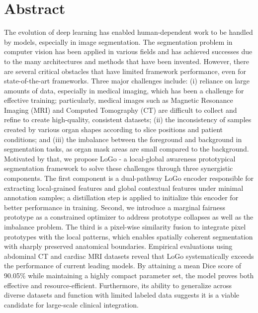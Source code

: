 \chapter*{Abstract}

The evolution of deep learning has enabled human-dependent work to be handled by models, especially in image segmentation. The segmentation problem in computer vision has been applied in various fields and has achieved successes due to the many architectures and methods that have been invented. However, there are several critical obstacles that have limited framework performance, even for state-of-the-art frameworks. Three major challenges include: (i) reliance on large amounts of data, especially in medical imaging, which has been a challenge for effective training; particularly, medical images such as Magnetic Resonance Imaging (MRI) and Computed Tomography (CT) are difficult to collect and refine to create high-quality, consistent datasets; (ii) the inconsistency of samples created by various organ shapes according to slice positions and patient conditions; and (iii) the imbalance between the foreground and background in segmentation tasks, as organ mask areas are small compared to the background. Motivated by that, we propose LoGo - a local-global awareness prototypical segmentation framework to solve these challenges through three synergistic components. The first component is a dual-pathway LoGo encoder responsible for extracting local-grained features and global contextual features under minimal annotation samples; a distillation step is applied to initialize this encoder for better performance in training. Second, we introduce a marginal fairness prototype as a constrained optimizer to address prototype collapses as well as the imbalance problem. The third is a pixel-wise similarity fusion to integrate pixel prototypes with the local patterns, which enables spatially coherent segmentation with sharply preserved anatomical boundaries. Empirical evaluations using abdominal CT and cardiac MRI datasets reveal that LoGo systematically exceeds the performance of current leading models. By attaining a mean Dice score of 90.05\% while maintaining a highly compact parameter set, the model proves both effective and resource-efficient. Furthermore, its ability to generalize across diverse datasets and function with limited labeled data suggests it is a viable candidate for large-scale clinical integration.